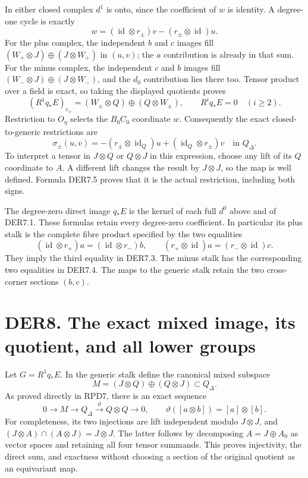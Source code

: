 In either closed complex \(d^1\) is onto, since the coefficient of \(w\)
is identity. A degree-one cycle is exactly \[
w=(\operatorname{id}\otimes r_\pm)v
 -(r_\pm\otimes\operatorname{id})u.
\tag{DER7.5}
\] For the plus complex, the independent \(b\) and \(c\) images fill
\((W_+\otimes J)\oplus(J\otimes W_+)\) in \((u,v)\); the \(a\)
contribution is already in that sum. For the minus complex, the
independent \(c\) and \(b\) images fill
\((W_-\otimes J)\oplus(J\otimes W_-)\), and the \(d_0\) contribution
lies there too. Tensor product over a field is exact, so taking the
displayed quotients proves \[
(R^1q_*E)_{c_\pm}
=(W_\pm\otimes Q)\oplus(Q\otimes W_\pm),\qquad
R^iq_*E=0\quad(i\geq2).
\tag{DER7.6}
\] Restriction to \(O_\eta\) selects the \(B_0C_0\) coordinate \(w\).
Consequently the exact closed-to-generic restrictions are \[
\sigma_\pm(u,v)
=-(r_\pm\otimes\operatorname{id}_Q)u
 +(\operatorname{id}_Q\otimes r_\pm)v
 \quad\text{in }Q_\Delta .
\tag{DER7.7}
\] To interpret a tensor in \(J\otimes Q\) or \(Q\otimes J\) in this
expression, choose any lift of its \(Q\) coordinate to \(A\). A
different lift changes the result by \(J\otimes J\), so the map is well
defined. Formula DER7.5 proves that it is the actual restriction,
including both signs.

The degree-zero direct image \(q_*E\) is the kernel of each full \(d^0\)
above and of DER7.1. These formulas retain every degree-zero
coefficient. In particular its plus stalk is the complete fibre product
specified by the two equalities \[
(\operatorname{id}\otimes r_+)a=(\operatorname{id}\otimes r_-)b,
\qquad
(r_+\otimes\operatorname{id})a=(r_-\otimes\operatorname{id})c.
\tag{DER7.8}
\] They imply the third equality in DER7.3. The minus stalk has the
corresponding two equalities in DER7.4. The maps to the generic stalk
retain the two cross-corner sections \((b,c)\).

\section{DER8. The exact mixed image, its quotient, and all lower
groups}\label{der8.-the-exact-mixed-image-its-quotient-and-all-lower-groups}

Let \(G=R^1q_*E\). In the generic stalk define the canonical mixed
subspace \[
M=(J\otimes Q)\oplus(Q\otimes J)\subset Q_\Delta.
\] As proved directly in RPD7, there is an exact sequence \[
0\to M\longrightarrow Q_\Delta
 \xrightarrow{\vartheta}Q\otimes Q\to0,
\qquad \vartheta([a\otimes b])=[a]\otimes[b].
\tag{DER8.1}
\] For completeness, its two injections are lift independent modulo
\(J\otimes J\), and \((J\otimes A)\cap(A\otimes J)=J\otimes J\). The
latter follows by decomposing \(A=J\oplus A_0\) as vector spaces and
retaining all four tensor summands. This proves injectivity, the direct
sum, and exactness without choosing a section of the original quotient
as an equivariant map.

